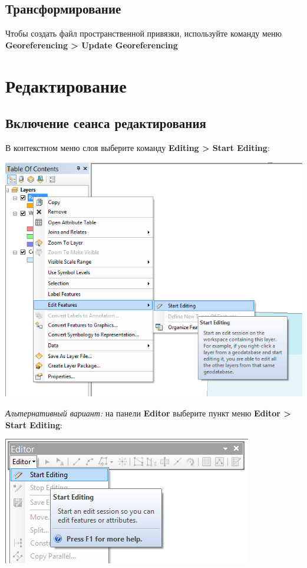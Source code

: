 \documentclass[]{book}
\theoremstyle{definition}
\theoremstyle{definition}
\theoremstyle{definition}
\theoremstyle{remark}
\begin{document}
\section{Трансформирование}

Чтобы создать файл пространственной привязки, используйте команду меню
\textbf{Georeferencing \textgreater{} Update Georeferencing}

\hypertarget{manual-edit}{%
\chapter{Редактирование}\label{manual-edit}}

\hypertarget{manual-edit-begin}{%
\section{Включение сеанса редактирования}\label{manual-edit-begin}}

В контекстном меню слоя выберите команду \textbf{Editing \textgreater{}
Start Editing}:

\includegraphics{images/Appendix/image87.png}

\emph{Альтернативный вариант:} на панели \textbf{Editor} выберите пункт
меню \textbf{Editor \textgreater{} Start Editing}:

\includegraphics{images/Appendix/image88.png}
\end{document}
